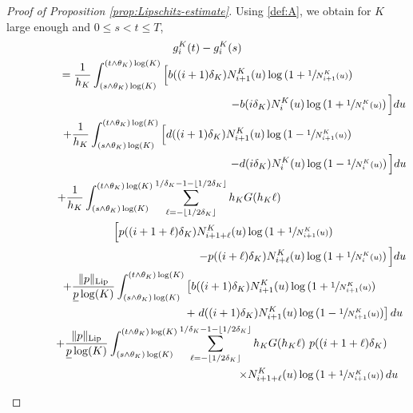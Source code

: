 \documentclass[JEP,XML,SOM,Unicode,published]{cedram}
\theoremstyle{plain}
\theoremstyle{remark}
\begin{document}
\begin{proof}[Proof of Proposition \ref{prop:Lipschitz-estimate}]
Using \eqref{def:A}, we obtain for $K$ large enough and $0\leq s<t\leq T$,
\begin{multline}\label{eq:horrible}
 g^K_{i}(t)-g^K_{i}(s) \\
 =\frac{1}{h_K}\int_{(s\wedge\theta_K)\log(K)}^{(t\wedge\theta_K)\log(K)}\Big[b((i+1)\delta_K)N^K_{i+1}(u) \log\left(1+\sfrac{1}{N^K_{i+1}(u)}\right)\\
 \hspace{7cm} -b(i\delta_K)N^K_{i}(u)
\log\left(1+\sfrac{1}{N^K_{i}(u)}\right)\Big] du \\
 +\frac{1}{h_K}\int_{(s\wedge\theta_K)\log(K)}^{(t\wedge\theta_K)\log(K)} \Big[d((i+1)\delta_K)N^K_{i+1}(u) \log\left(1-\sfrac{1}{N^K_{i+1}(u)}\right)\\
 \hspace{7cm} -d(i\delta_K)N^K_{i}(u)
\log\left(1-\sfrac{1}{N^K_{i}(u)}\right)\Big]du  \\
 \hspace*{-2.4cm}+\frac{1}{h_K}\int_{(s\wedge\theta_K)\log(K)}^{(t\wedge\theta_K)\log(K)} \sum_{\ell=-\lfloor 1/2\delta_K\rfloor}^{1/\delta_K-1-\lfloor 1/2\delta_K\rfloor} h_{K} G(h_{K}\ell)
\\
\hskip 1cm \Big[ p((i+1+\ell) \delta_{K})N^K_{i+1+\ell}(u)\log\left(1+\sfrac{1}{N^K_{i+1}(u)}\right)\\
 \hspace{6cm} -p((i+\ell) \delta_{K})N^K_{i+\ell}(u)\log\left(1+\sfrac{1}{N^K_{i}(u)}\right)\Big]du  \\
\hspace*{.8cm}+\frac{\|p\|_{\text{Lip}}}{\underline p\log(K)} \int_{(s\wedge\theta_K)\log(K)}^{(t\wedge\theta_K)\log(K)}\left[b((i+1)\delta_K)N^K_{i+1}(u) \log\left(1+\sfrac{1}{N^K_{i+1}(u)}\right)\right.\\
 \hspace{5.5cm}+\left. d((i+1)\delta_K)N^K_{i+1}(u) \log\left(1-\sfrac{1}{N^K_{i+1}(u)}\right)\right]du  \\
\hspace*{.9cm} +\frac{\|p\|_{\text{Lip}}}{\underline p\log(K)} \int_{(s\wedge\theta_K)\log(K)}^{(t\wedge\theta_K)\log(K)} \sum_{\ell=-\lfloor 1/2\delta_K\rfloor}^{1/\delta_K-1-\lfloor 1/2\delta_K\rfloor} h_{K} G(h_{K}\ell)\
p((i+1+\ell)\delta_K) \\
 \hspace{7cm} \times N^K_{i+1+\ell}(u)\log\left(1+\sfrac{1}{N^K_{i+1}(u)}\right)du
\end{multline}\vspace*{-3\baselineskip}
\begin{multline*}

\end{multline*}
\end{proof}
\end{document}

